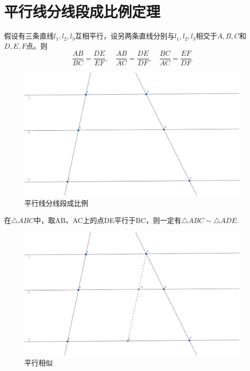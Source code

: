  
\section{平行线分线段成比例定理}
\begin{theorem}[平行线分线段成比例定理]
    假设有三条直线$l_1,l_2,l_3$互相平行，设另两条直线分别与$l_1,l_2,l_3$相交于$A,B,C$和$D,E,F$点。则
    $$\frac{AB}{BC} = \frac{DE}{EF},\quad 
    \frac{AB}{AC} = \frac{DE}{DF}, \quad 
    \frac{BC}{AC} = \frac{EF}{DF}$$
\end{theorem}
\begin{figure}[H]
    \centering
    \includegraphics[width=0.8\linewidth]{figures/平行线分线段成比例.png}
    \caption{平行线分线段成比例}
\end{figure}

\begin{proposition}[平行相似]
    在$\triangle ABC$中，取AB、AC上的点DE平行于BC，则一定有$\triangle ABC \sim \triangle ADE$.
\end{proposition}

\begin{figure}[H]
    \centering
    \includegraphics[width=0.8\linewidth]{figures/平行线分线段成比例 (1).png}
    \caption{平行相似}
\end{figure}


